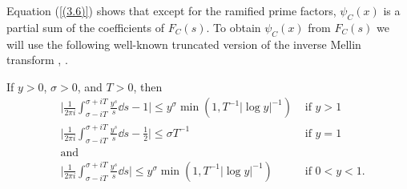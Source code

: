 \documentclass[./main]{subfiles}
\begin{document}
Equation (\ref{(3.6)}) shows that except for the ramified prime factors, $\psi_C(x)$ is a partial sum of the coefficients of $F_C(s)$. To obtain $\psi_C(x)$ from $F_C(s)$ we will use the following well-known truncated version of the inverse Mellin transform \cite[p. 54]{15-Tschebotareff1926}, \cite[pp. 109-110]{2-davenport2013multiplicative}.

\begin{lemma} \label{3.1}
If $y>0$, $\sigma>0$, and $T>0$, then \begin{align*}
    &\bigg| \frac{1}{2 \pi i} \int_{\sigma-iT}^{\sigma+iT} \frac{y^s}{s}\dd s-1 \bigg| \le y^\sigma \min(1, T^{-1}|\log y|^{-1}) &\text{ if } y>1 \\
     &\bigg| \frac{1}{2 \pi i} \int_{\sigma-iT}^{\sigma+iT} \frac{y^s}{s}\dd s-\frac{1}{2} \bigg| \le \sigma T^{-1}& \text{ if } y=1 \\
    &\text{and} &\\
     &\bigg| \frac{1}{2 \pi i} \int_{\sigma-iT}^{\sigma+iT} \frac{y^s}{s}\dd s\bigg| \le y^\sigma \min(1, T^{-1}|\log y|^{-1})&\text{ if } 0<y<1.
\end{align*}
\end{lemma}
\end{document}
